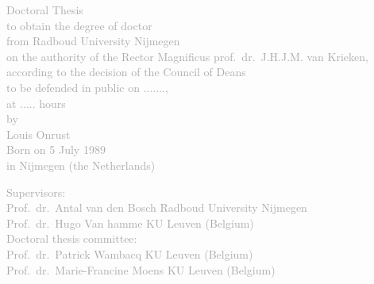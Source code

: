 \begin{titlepage}\thispagestyle{empty}
    \sffamily%
    \begin{fullwidth}%
        \fontsize{36}{40}\selectfont\par\noindent\textcolor{darkgray}{\allcaps{\thanklesstitle}}%
        \vfill%
        \fontsize{18}{20}\selectfont\par\noindent\textcolor{darkgray}{\centering%
        Doctoral Thesis \\[2em] to obtain the degree of doctor\\
        from Radboud University Nijmegen\\
        on the authority of the Rector Magnificus prof.~dr.~J.H.J.M. van Krieken,\\
        according to the decision of the Council of Deans \\
        to be defended in public on ......., \\
        at ..... hours \\[2em]
        \vfill%
        by \\
        Louis Onrust \\
        Born on 5 July 1989 \\
        in Nijmegen (the Netherlands) \\
        }%
        \newpage\thispagestyle{empty}
        \vspace{1.7cm}%
        \fontsize{18}{20}\selectfont\par\noindent\textcolor{darkgray}{%
        \begin{tabbing}
        Supervisors: \\[1.5em]
  		Prof.~dr.~Antal van den Bosch \qquad\= Radboud University Nijmegen\\
  		Prof.~dr.~Hugo Van hamme \>KU Leuven (Belgium) \\[2em]
        \noindent Doctoral thesis committee: \\[1.5em]
  		Prof.~dr.~Patrick Wambacq \> KU Leuven (Belgium)\\
  		Prof.~dr.~Marie-Francine Moens \>KU Leuven (Belgium)
		\end{tabbing}
        }%
    \end{fullwidth}%
\end{titlepage}

\makeatother